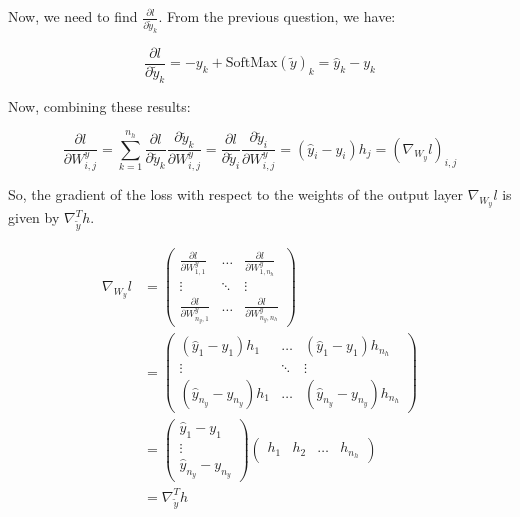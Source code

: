\documentclass{article}
\theoremstyle{plain}%
\theoremstyle{definition}
\theoremstyle{remark}
\begin{document}
Now, we need to find \( \frac{\partial l}{\partial \tilde{y}_k} \). From the previous question, we have:

\[
    \frac{\partial l}{\partial \tilde{y}_k} = -y_k + \text{SoftMax}(\tilde{y})_k = \hat{y}_k - y_k
\]

Now, combining these results:

\[
    \frac{\partial l}{\partial W_{i,j}^y} = \sum_{k=1}^{n_h} \frac{\partial l}{\partial \tilde{y}_k} \frac{\partial \tilde{y}_k}{\partial W_{i,j}^y} =  \frac{\partial l}{\partial \tilde{y}_i} \frac{\partial \tilde{y}_i}{\partial W_{i,j}^y} = (\hat{y}_i - y_i) h_j = (\nabla _{W_y} l)_{i,j}
\]

So, the gradient of the loss with respect to the weights of the output layer \( \nabla_{W_y} l \) is given by \( \nabla _{\tilde{y}} ^T h \).

\begin{align*}
    \nabla_{W_y} l & = \begin{pmatrix}
        \frac{\partial l}{\partial W^y_{1,1}}   & \dots  & \frac{\partial l}{\partial W^y_{1,n_h}}    \\
        \vdots                                  & \ddots & \vdots                                     \\
        \frac{\partial l}{\partial W^y_{n_y,1}} & \dots  & \frac{\partial l}{\partial W^y_{n_y, n_h}}
    \end{pmatrix}                            \\
                   & = \begin{pmatrix}
        (\hat{y}_1 - y_1) h_{1}         & \dots  & (\hat{y}_1 - y_1) h_{n_h}         \\
        \vdots                          & \ddots & \vdots                            \\
        (\hat{y}_{n_y} - y_{n_y}) h_{1} & \dots  & (\hat{y}_{n_y} - y_{n_y}) h_{n_h}
    \end{pmatrix}                            \\
                   & = \begin{pmatrix}
        \hat{y}_1 - y_1 \\
        \vdots          \\
        \hat{y}_{n_y} - y_{n_y}
    \end{pmatrix} \begin{pmatrix}
        h_1 & h_2 & \dots & h_{n_h}
    \end{pmatrix} \\
                   & = \nabla _{\tilde{y}} ^T h
\end{align*}
\end{document}
